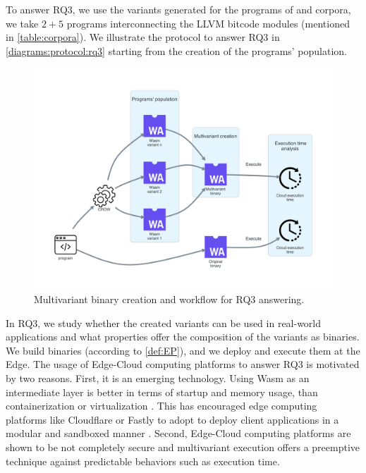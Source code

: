 
\section{\rqthree}
\label{rq3:method}




\newcommand{\mewe}{MEWE\xspace}

To answer RQ3, we use the variants generated for the programs of \corpussodium and \corpusqrcode corpora, we take $2 + 5$ programs interconnecting the LLVM bitcode modules (mentioned in \autoref{table:corpora}). We illustrate the protocol to answer RQ3 in \autoref{diagrams:protocol:rq3} starting from the creation of the programs' population.

\begin{figure}[h]
    \centering
    \includegraphics[width=0.8\linewidth]{diagrams/Rq3.pdf}
    \caption{Multivariant binary creation and workflow for RQ3 answering.}
    \label{diagrams:protocol:rq3}
\end{figure}

In RQ3, we study whether the created variants can be used in real-world applications and what properties offer the composition of the variants as binaries. We build binaries (according to \autoref{def:EP}), and we deploy and execute them at the Edge. 
The usage of Edge-Cloud computing platforms to answer RQ3 is motivated by two reasons. First, it is an emerging technology. 
Using Wasm as an intermediate layer is better in terms of startup and memory usage, than containerization or virtualization \cite{pMendkiServerless, 1244493Jacobsson}. 
This has encouraged edge computing platforms like Cloudflare or Fastly to adopt \wasm to deploy client applications in a modular and sandboxed manner  \cite{CloudflareWasm, FastlyWasm}.
Second, Edge-Cloud computing platforms are shown to be not completely secure \cite{Narayan2021Swivel} and multivariant execution offers a preemptive technique against predictable behaviors such as execution time.




